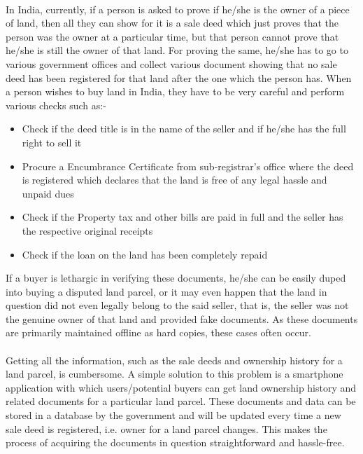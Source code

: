 \documentclass{article}
\begin{document}
        \paragraph{}
        In India, currently, if a person is asked to prove if he/she is the owner of a piece of land, then all they can show for it is a sale deed which just proves that the person was the owner at a particular time, but that person cannot prove that he/she is still the owner of that land. For proving the same, he/she has to go to various government offices and collect various document showing that no sale deed has been registered for that land after the one which the person has. When a person wishes to buy land in India, they have to be very careful and perform various checks such as:-
        \begin{itemize}
            \item Check if the deed title is in the name of the seller and if he/she has the full right to sell it
            \item Procure a Encumbrance Certificate from sub-registrar's office where the deed is registered which declares that the land is free of any legal hassle and unpaid dues
            \item Check if the Property tax and other bills are paid in full and the seller has the respective original receipts
            \item Check if the loan on the land has been completely repaid
        \end{itemize}
        If a buyer is lethargic in verifying these documents, he/she can be easily duped into buying a disputed land parcel, or it may even happen that the land in question did not even legally belong to the said seller, that is, the seller was not the genuine owner of that land and provided fake documents. As these documents are primarily maintained offline as hard copies, these cases often occur.

        \paragraph{}
        Getting all the information, such as the sale deeds and ownership history for a land parcel, is cumbersome. A simple solution to this problem is a smartphone application with which users/potential buyers can get land ownership history and related documents for a particular land parcel. These documents and data can be stored in a database by the government and will be updated every time a new sale deed is registered, i.e. owner for a land parcel changes. This makes the process of acquiring the documents in question straightforward and hassle-free.
\end{document}
